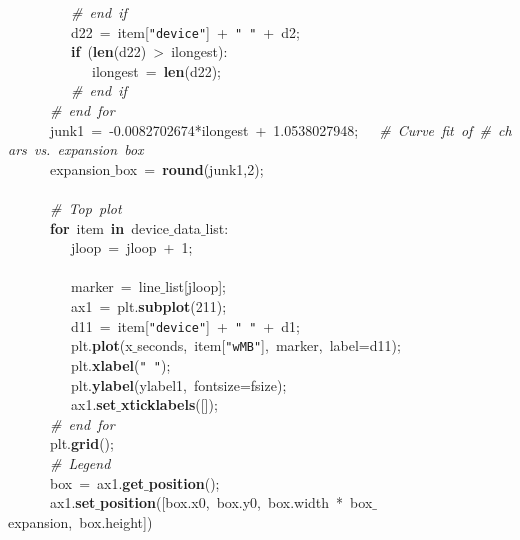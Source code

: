 \mbox{}\ \ \ \ \ \ \ \ \ \textit{\#\ end\ if} \\
\mbox{}\ \ \ \ \ \ \ \ \ d22\ =\ item[\texttt{"{}device"{}}]\ +\ \texttt{"{}\ "{}}\ +\ d2; \\
\mbox{}\ \ \ \ \ \ \ \ \ \textbf{if}\ (\textbf{len}(d22)\ \textgreater{}\ ilongest): \\
\mbox{}\ \ \ \ \ \ \ \ \ \ \ \ ilongest\ =\ \textbf{len}(d22); \\
\mbox{}\ \ \ \ \ \ \ \ \ \textit{\#\ end\ if} \\
\mbox{}\ \ \ \ \ \ \textit{\#\ end\ for} \\
\mbox{}\ \ \ \ \ \ junk1\ =\ -0.0082702674*ilongest\ +\ 1.0538027948;\ \ \ \textit{\#\ Curve\ fit\ of\ \#\ chars\ vs.\ expansion\ box} \\
\mbox{}\ \ \ \ \ \ expansion$\_$box\ =\ \textbf{round}(junk1,2); \\
\mbox{}\ \ \ \ \ \  \\
\mbox{}\ \ \ \ \ \ \textit{\#\ Top\ plot} \\
\mbox{}\ \ \ \ \ \ \textbf{for}\ item\ \textbf{in}\ device$\_$data$\_$list: \\
\mbox{}\ \ \ \ \ \ \ \ \ jloop\ =\ jloop\ +\ 1; \\
\mbox{}\ \ \ \ \ \ \ \ \  \\
\mbox{}\ \ \ \ \ \ \ \ \ marker\ =\ line$\_$list[jloop]; \\
\mbox{}\ \ \ \ \ \ \ \ \ ax1\ =\ plt.\textbf{subplot}(211); \\
\mbox{}\ \ \ \ \ \ \ \ \ d11\ =\ item[\texttt{"{}device"{}}]\ +\ \texttt{"{}\ "{}}\ +\ d1; \\
\mbox{}\ \ \ \ \ \ \ \ \ plt.\textbf{plot}(x$\_$seconds,\ item[\texttt{"{}wMB"{}}],\ marker,\ label=d11); \\
\mbox{}\ \ \ \ \ \ \ \ \ plt.\textbf{xlabel}(\texttt{"{}\ "{}}); \\
\mbox{}\ \ \ \ \ \ \ \ \ plt.\textbf{ylabel}(ylabel1,\ fontsize=fsize); \\
\mbox{}\ \ \ \ \ \ \ \ \ ax1.\textbf{set$\_$xticklabels}([]); \\
\mbox{}\ \ \ \ \ \ \textit{\#\ end\ for} \\
\mbox{}\ \ \ \ \ \ plt.\textbf{grid}(); \\
\mbox{}\ \ \ \ \ \ \textit{\#\ Legend} \\
\mbox{}\ \ \ \ \ \ box\ =\ ax1.\textbf{get$\_$position}(); \\
\mbox{}\ \ \ \ \ \ ax1.\textbf{set$\_$position}([box.x0,\ box.y0,\ box.width\ *\ box$\_$expansion,\ box.height]) \\
